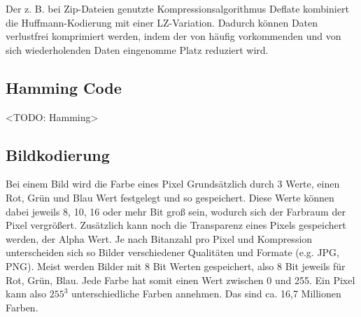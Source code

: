 Der z. B. bei Zip-Dateien genutzte Kompressionsalgorithmus Deflate kombiniert
die Huffmann-Kodierung mit einer LZ-Variation. Dadurch können Daten verlustfrei
komprimiert werden, indem der von häufig vorkommenden und von sich wiederholenden
Daten eingenomme Platz reduziert wird. 

\subsection{Hamming Code}

<TODO: Hamming>

\subsection{Bildkodierung}

Bei einem Bild wird die Farbe eines Pixel Grundsätzlich durch 3 Werte, einen Rot,
Grün und Blau Wert festgelegt und so gespeichert. Diese Werte können dabei jeweils
8, 10, 16 oder mehr Bit groß sein, wodurch sich der Farbraum der Pixel vergrößert.
Zusätzlich kann noch die Transparenz eines Pixels gespeichert werden, der Alpha Wert.
Je nach Bitanzahl pro Pixel und Kompression unterscheiden sich so Bilder verschiedener
Qualitäten und Formate (e.g. JPG, PNG). Meist werden Bilder mit 8 Bit Werten gespeichert,
also 8 Bit jeweils für Rot, Grün, Blau. Jede Farbe hat somit einen Wert zwischen 0 und 255.
Ein Pixel kann also $255^3$ unterschiedliche Farben annehmen. Das sind ca. 16,7 Millionen
Farben.
